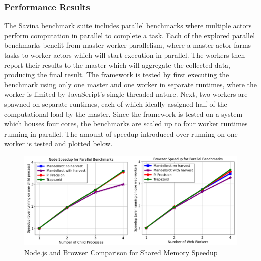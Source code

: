 \documentclass[oneside]{um-fict}
\begin{document}
\subsubsection{Performance Results}
The Savina benchmark suite includes parallel benchmarks where multiple actors perform computation in parallel to complete a task. Each of the explored parallel benchmarks benefit from master-worker parallelism, where a master actor farms tasks to worker actors which will start execution in parallel. The workers then report their results to the master which will aggregate the collected data, producing the final result. The framework is tested by first executing the benchmark using only one master and one worker in separate runtimes, where the worker is limited by JavaScript's single-threaded nature.  Next, two workers are spawned on separate runtimes, each of which ideally assigned half of the computational load by the master. Since the framework is tested on a system which houses four cores, the benchmarks are scaled up to four worker runtimes running in parallel. The amount of speedup introduced over running on one worker is tested and plotted below.
\begin{figure}[H]
    \begin{centering}
        \includegraphics[width=\textwidth]{resources/shared_memory_speedup.png}
        \caption{Node.js and Browser Comparison for Shared Memory Speedup}
    \end{centering}
\end{figure}
\end{document}
